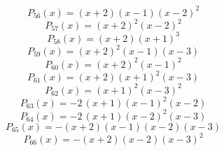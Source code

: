 \subitem \begin{dmath*}P_{56}(x) = {\left(x + 2\right)} {\left(x - 1\right)} {\left(x - 2\right)}^{2} \end{dmath*}\vspace{-1.2cm}
\subitem \begin{dmath*}P_{57}(x) = {\left(x + 2\right)}^{2} {\left(x - 2\right)}^{2} \end{dmath*}\vspace{-1.2cm}
\subitem \begin{dmath*}P_{58}(x) = {\left(x + 2\right)} {\left(x + 1\right)}^{3} \end{dmath*}\vspace{-1.2cm}
\subitem \begin{dmath*}P_{59}(x) = {\left(x + 2\right)}^{2} {\left(x - 1\right)} {\left(x - 3\right)} \end{dmath*}\vspace{-1.2cm}
\subitem \begin{dmath*}P_{60}(x) = {\left(x + 2\right)}^{2} {\left(x - 1\right)}^{2} \end{dmath*}\vspace{-1.2cm}
\subitem \begin{dmath*}P_{61}(x) = {\left(x + 2\right)} {\left(x + 1\right)}^{2} {\left(x - 3\right)} \end{dmath*}\vspace{-1.2cm}
\subitem \begin{dmath*}P_{62}(x) = {\left(x + 1\right)}^{2} {\left(x - 3\right)}^{2} \end{dmath*}\vspace{-1.2cm}
\subitem \begin{dmath*}P_{63}(x) = -2 \, {\left(x + 1\right)} {\left(x - 1\right)}^{2} {\left(x - 2\right)} \end{dmath*}\vspace{-1.2cm}
\subitem \begin{dmath*}P_{64}(x) = -2 \, {\left(x + 1\right)} {\left(x - 2\right)}^{2} {\left(x - 3\right)} \end{dmath*}\vspace{-1.2cm}
\subitem \begin{dmath*}P_{65}(x) = -{\left(x + 2\right)} {\left(x - 1\right)} {\left(x - 2\right)} {\left(x - 3\right)} \end{dmath*}\vspace{-1.2cm}
\subitem \begin{dmath*}P_{66}(x) = -{\left(x + 2\right)} {\left(x - 2\right)} {\left(x - 3\right)}^{2} \end{dmath*}\vspace{-1.2cm}
